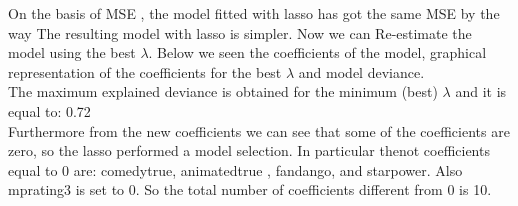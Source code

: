 \documentclass[11pt]{article}
\begin{document}
    On the basis of MSE , the model fitted with lasso has got the same MSE
by the way The resulting model with lasso is simpler. Now we can
Re-estimate the model using the best \(\lambda\). Below we seen the
coefficients of the model, graphical representation of the coefficients
for the best \(\lambda\) and model deviance.\\
The maximum explained deviance is obtained for the minimum (best)
\(\lambda\) and it is equal to: 0.72\\
Furthermore from the new coefficients we can see that some of the
coefficients are zero, so the lasso performed a model selection. In
particular thenot coefficients equal to 0 are: comedytrue, animatedtrue
, fandango, and starpower. Also mprating3 is set to 0. So the total
number of coefficients different from 0 is 10.
\end{document}
